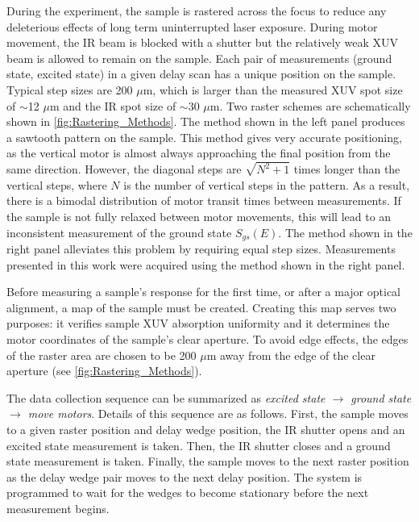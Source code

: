 During the experiment, the sample is rastered across the focus to reduce any deleterious effects of long term uninterrupted laser exposure. During motor movement, the IR beam is blocked with a shutter but the relatively weak XUV beam is allowed to remain on the sample. Each pair of measurements (ground state, excited state) in a given delay scan has a unique position on the sample. Typical step sizes are 200 $\mu$m, which is larger than the measured XUV spot size of $\sim$12 $\mu$m and the IR spot size of $\sim$30 $\mu$m. Two raster schemes are schematically shown in \cref{fig:Rastering_Methods}. The method shown in the left panel produces a sawtooth pattern on the sample. This method gives very accurate positioning, as the vertical motor is almost always approaching the final position from the same direction. However, the diagonal steps are $\sqrt{N^2+1}$ times longer than the vertical steps, where $N$ is the number of vertical steps in the pattern. As a result, there is a bimodal distribution of motor transit times between measurements. If the sample is not fully relaxed between motor movements, this will lead to an inconsistent measurement of the ground state $S_{gs}(E)$. The method shown in the right panel alleviates this problem by requiring equal step sizes. Measurements presented in this work were acquired using the method shown in the right panel.

Before measuring a sample's response for the first time, or after a major optical alignment, a map of the sample must be created. Creating this map serves two purposes: it verifies sample XUV absorption uniformity and it determines the motor coordinates of the sample's clear aperture. To avoid edge effects, the edges of the raster area are chosen to be 200 $\mu$m away from the edge of the clear aperture (see \cref{fig:Rastering_Methods}).

The data collection sequence can be summarized as \textit{excited state $\rightarrow$ ground state $\rightarrow$ move motors}. Details of this sequence are as follows. First, the sample moves to a given raster position and delay wedge position, the IR shutter opens and an excited state measurement is taken. Then, the IR shutter closes and a ground state measurement is taken. Finally, the sample moves to the next raster position as the delay wedge pair moves to the next delay position. The system is programmed to wait for the wedges to become stationary before the next measurement begins.

